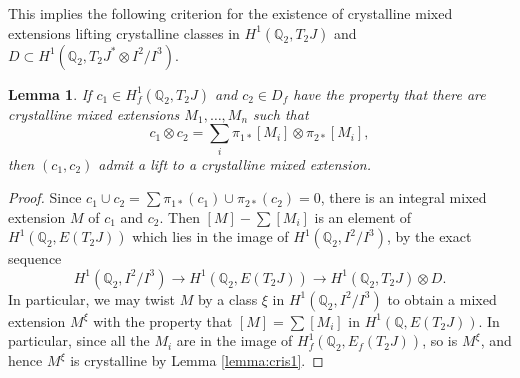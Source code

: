 \documentclass[11pt]{amsart}
\def\Q{\mathbb Q}
\theoremstyle{plain}
\newtheorem{lemma}{Lemma}
\theoremstyle{definition}
\newcommand{\cris}{\mathrm{cris}}
\begin{document}
This implies the following criterion for the existence of crystalline mixed extensions lifting crystalline classes in $H^1 (\Q _2 ,T_2 J)$ and $D\subset H^1 (\Q _2 ,T_2 J ^* \otimes I^2 /I^3 )$.
\begin{lemma}\label{lemma:cris2}
If $c_1 \in H^1 _f (\Q _2 ,T_2 J )$ and $c_2 \in D_f$ have the property that there are crystalline mixed extensions $M_1 ,\ldots ,M_n$ such that 
\[
c_1 \otimes c_2 =\sum _i \pi _{1 *}[M_i ]\otimes \pi _{2 *}[M_i ],
\]
then $(c_1 ,c_2 )$ admit a lift to a crystalline mixed extension.
\end{lemma}
\begin{proof}
Since $c_1 \cup c_2 =\sum \pi _{1 *}(c_1 )\cup \pi _{2 *}(c_2 )=0$, there is an integral mixed extension $M$ of $c_1 $ and $c_2 $. Then $[M]-\sum [M_i ]$ is an element of $H^1 (\Q _2 ,E(T_2 J ))$ which lies in the image of $H^1 (\Q _2 ,I^2 /I^3  )$, by the exact sequence
\[
H^1 (\Q _2 ,I^2 /I^3  )\to H^1 (\Q _2 ,E(T_2 J))\to H^1 (\Q _2 ,T_2 J )\otimes D.
\]
In particular, we may twist $M$ by a class $\xi $ in $H^1 (\Q _2 ,I^2 /I^3 )$ to obtain a mixed extension $M^\xi $ with the property that $[M]=\sum [M_i ]$ in $H^1 (\Q ,E(T_2 J))$. In particular, since all the $M_i$ are in the image of $H^1 _f (\Q _2 ,E_f (T_2 J))$, so is $M^{\xi }$, and hence $M^{\xi }$ is crystalline by Lemma \ref{lemma:cris1}.
\end{proof}
%
%

%
\end{document}
